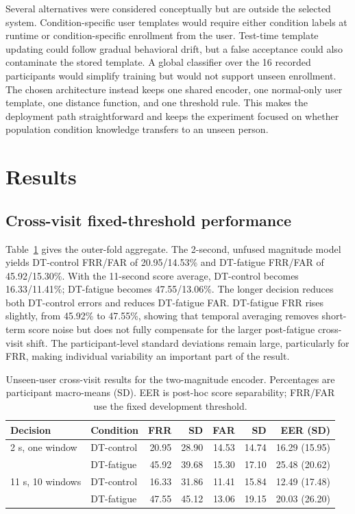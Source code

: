 \documentclass[conference]{IEEEtran}
\begin{document}
Several alternatives were considered conceptually but are outside the selected system. Condition-specific user templates would require either condition labels at runtime or condition-specific enrollment from the user. Test-time template updating could follow gradual behavioral drift, but a false acceptance could also contaminate the stored template. A global classifier over the 16 recorded participants would simplify training but would not support unseen enrollment. The chosen architecture instead keeps one shared encoder, one normal-only user template, one distance function, and one threshold rule. This makes the deployment path straightforward and keeps the experiment focused on whether population condition knowledge transfers to an unseen person.

\section{Results}
\subsection{Cross-visit fixed-threshold performance}
Table~\ref{tab:proposed} gives the outer-fold aggregate. The 2-second, unfused magnitude model yields DT-control FRR/FAR of 20.95/14.53\% and DT-fatigue FRR/FAR of 45.92/15.30\%. With the 11-second score average, DT-control becomes 16.33/11.41\%; DT-fatigue becomes 47.55/13.06\%. The longer decision reduces both DT-control errors and reduces DT-fatigue FAR. DT-fatigue FRR rises slightly, from 45.92\% to 47.55\%, showing that temporal averaging removes short-term score noise but does not fully compensate for the larger post-fatigue cross-visit shift. The participant-level standard deviations remain large, particularly for FRR, making individual variability an important part of the result.

\begin{table}[t]
\caption{Unseen-user cross-visit results for the two-magnitude encoder. Percentages are participant macro-means (SD). EER is post-hoc score separability; FRR/FAR use the fixed development threshold.}
\label{tab:proposed}
\centering\scriptsize
\setlength{\tabcolsep}{2.5pt}
\begin{tabular}{llrrrrr}
\toprule
Decision & Condition & FRR & SD & FAR & SD & EER (SD)\\
\midrule
2 s, one window & DT-control & 20.95 & 28.90 & 14.53 & 14.74 & 16.29 (15.95)\\
 & DT-fatigue & 45.92 & 39.68 & 15.30 & 17.10 & 25.48 (20.62)\\
11 s, 10 windows & DT-control & 16.33 & 31.86 & 11.41 & 15.84 & 12.49 (17.48)\\
 & DT-fatigue & 47.55 & 45.12 & 13.06 & 19.15 & 20.03 (26.20)\\
\bottomrule
\end{tabular}
\end{table}
\end{document}

